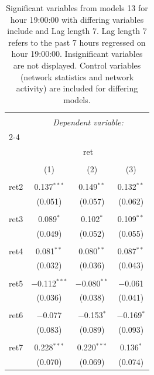 
\begin{table}[!htbp] \centering 
  \caption{Significant variables from models 13 for hour 19:00:00 with differing variables include 
                               and Lag length 7. Lag length 7 refers to the past 7 hours regressed on hour 19:00:00. 
                               Insignificant variables are not displayed. 
                               Control variables (network statistics and network activity) are 
                               included for differing models.} 
  \label{RVmodels2_t_hourlagged6} 
\scriptsize 
\begin{tabular}{@{\extracolsep{5pt}}lccc} 
\\[-1.8ex]\hline 
\hline \\[-1.8ex] 
 & \multicolumn{3}{c}{\textit{Dependent variable:}} \\ 
\cline{2-4} 
\\[-1.8ex] & \multicolumn{3}{c}{ret} \\ 
\\[-1.8ex] & (1) & (2) & (3)\\ 
\hline \\[-1.8ex] 
 ret2 & 0.137$^{***}$ & 0.149$^{**}$ & 0.132$^{**}$ \\ 
  & (0.051) & (0.057) & (0.062) \\ 
  & & & \\ 
 ret3 & 0.089$^{*}$ & 0.102$^{*}$ & 0.109$^{**}$ \\ 
  & (0.049) & (0.052) & (0.055) \\ 
  & & & \\ 
 ret4 & 0.081$^{**}$ & 0.080$^{**}$ & 0.087$^{**}$ \\ 
  & (0.032) & (0.036) & (0.043) \\ 
  & & & \\ 
 ret5 & $-$0.112$^{***}$ & $-$0.080$^{**}$ & $-$0.061 \\ 
  & (0.036) & (0.038) & (0.041) \\ 
  & & & \\ 
 ret6 & $-$0.077 & $-$0.153$^{*}$ & $-$0.169$^{*}$ \\ 
  & (0.083) & (0.089) & (0.093) \\ 
  & & & \\ 
 ret7 & 0.228$^{***}$ & 0.220$^{***}$ & 0.136$^{*}$ \\ 
  & (0.070) & (0.069) & (0.074) \\ 

\end{tabular}
\end{table}
